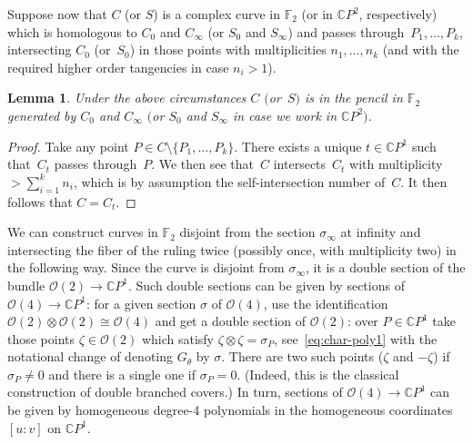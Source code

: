 \documentclass[pdftex]{sigma}
\newcommand{\CP}[1]{\mathbb{C}P^{#1}} %
\numberwithin{equation}{section}
\newtheorem{lem}[prop]{Lemma}
\begin{document}
Suppose now that $C$ (or $S$) is a complex curve in ${\mathbb {F}}_2$
(or in $\CP{2}$, respectively) which is homologous to $C_0$ and
$C_{\infty}$ (or $S_0$ and $S_{\infty}$) and passes through~$P_1,
\ldots , P_k$, intersecting $C_0$ (or~$S_0$) in those points with
multiplicities $n_1, \ldots ,n_k$ (and with the required higher order
tangencies in case $n_i>1$).

\begin{lem} \label{lem:princ} Under the above circumstances $C$ $($or~$S)$ is in the pencil in ${\mathbb {F}}_2$ generated by $C_0$ and $C_{\infty}$ $($or $S_0$ and $S_{\infty}$ in case we work in $\CP{2})$.
\end{lem}
\begin{proof}
Take any point $P\in C\setminus \{ P_1, \ldots , P_k \}$. There exists a unique $t\in \CP1$ such that~$C_t$ passes through~$P$. We then see that~$C$ intersects~$C_t$ with multiplicity $>\sum_{i=1}^kn_i$, which is by assumption the self-intersection number of~$C$. It then follows that $C = C_t$.
\end{proof}

We can construct curves in ${\mathbb {F}}_2$ disjoint from the section
$\sigma _{\infty}$ at infinity and intersecting the fiber of the ruling
twice (possibly once, with multiplicity two) in the following way.
Since the curve is disjoint from $\sigma _{\infty}$, it is a double section
of the bundle ${\mathcal {O}}(2)\to \CP{1}$. Such double sections
can be given by sections of ${\mathcal {O}}(4)\to \CP{1}$:
for a given section $\sigma$ of ${\mathcal {O}}(4)$, use
the identification ${\mathcal {O}}(2)\otimes {\mathcal {O}}(2)\cong
{\mathcal {O}}(4)$ and get a double section of ${\mathcal {O}}(2)$:
over $P\in \CP{1}$ take those points $\zeta \in {\mathcal {O}}(2)$ which
satisfy $\zeta \otimes \zeta =\sigma _P$, see~\eqref{eq:char-poly1} with
the notational change of denoting
$G_{\theta}$ by $\sigma$.
There are two such points ($\zeta $ and $-\zeta $)
if $\sigma _P\neq 0$ and there is a single one if $\sigma _P=0$.
(Indeed, this is the classical construction of double branched covers.)
In turn, sections of ${\mathcal {O}}(4)\to \CP{1}$ can be given by
homogeneous degree-4 polynomials in the homogeneous coordinates
$[u:v]$ on $\CP{1}$.
\end{document}
